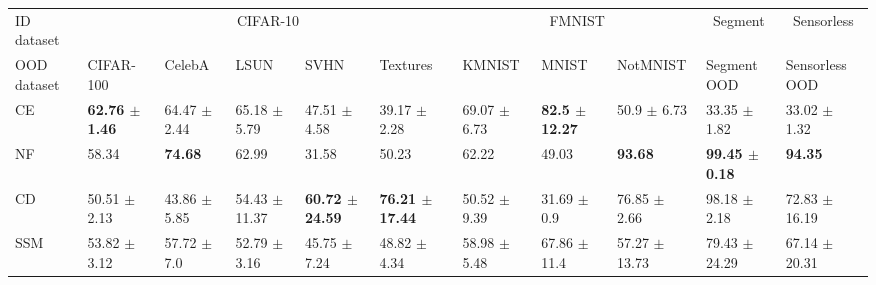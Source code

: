 \begin{tabular}{lllllllllll}
\toprule
ID dataset & \multicolumn{5}{c}{CIFAR-10} & \multicolumn{3}{c}{FMNIST} &                                      \multicolumn{1}{c}{Segment} &                         \multicolumn{1}{c}{Sensorless} \\
\cmidrule(l){2-6} \cmidrule(l){7-9} \cmidrule(l){10-10} \cmidrule(l){11-11} 
OOD dataset &                                    CIFAR-100 &                            CelebA &                                         LSUN &                                          SVHN &                                      Textures &                                        KMNIST &                                        MNIST &                           NotMNIST &                                  Segment OOD &                     Sensorless OOD \\
\midrule
CE    &  \bfseries{62.76 {\footnotesize $\pm$ 1.46}} &  64.47 {\footnotesize $\pm$ 2.44} &             65.18 {\footnotesize $\pm$ 5.79} &              47.51 {\footnotesize $\pm$ 4.58} &              39.17 {\footnotesize $\pm$ 2.28} &              69.07 {\footnotesize $\pm$ 6.73} &  \bfseries{82.5 {\footnotesize $\pm$ 12.27}} &    50.9 {\footnotesize $\pm$ 6.73} &             33.35 {\footnotesize $\pm$ 1.82} &   33.02 {\footnotesize $\pm$ 1.32} \\
NF    &                                       58.34  &                 \bfseries{74.68 } &                                       62.99  &                                        31.58  &                                        50.23  &                                        62.22  &                                       49.03  &                  \bfseries{93.68 } &  \bfseries{99.45 {\footnotesize $\pm$ 0.18}} &                  \bfseries{94.35 } \\
\midrule
CD  &             50.51 {\footnotesize $\pm$ 2.13} &  43.86 {\footnotesize $\pm$ 5.85} &            54.43 {\footnotesize $\pm$ 11.37} &  \bfseries{60.72 {\footnotesize $\pm$ 24.59}} &  \bfseries{76.21 {\footnotesize $\pm$ 17.44}} &              50.52 {\footnotesize $\pm$ 9.39} &              31.69 {\footnotesize $\pm$ 0.9} &   76.85 {\footnotesize $\pm$ 2.66} &             98.18 {\footnotesize $\pm$ 2.18} &  72.83 {\footnotesize $\pm$ 16.19} \\
SSM   &             53.82 {\footnotesize $\pm$ 3.12} &   57.72 {\footnotesize $\pm$ 7.0} &             52.79 {\footnotesize $\pm$ 3.16} &              45.75 {\footnotesize $\pm$ 7.24} &              48.82 {\footnotesize $\pm$ 4.34} &              58.98 {\footnotesize $\pm$ 5.48} &             67.86 {\footnotesize $\pm$ 11.4} &  57.27 {\footnotesize $\pm$ 13.73} &            79.43 {\footnotesize $\pm$ 24.29} &  67.14 {\footnotesize $\pm$ 20.31} \\

\end{tabular}

